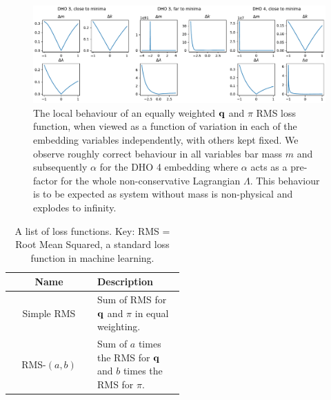 \begin{figure}[t]
  \includegraphics[width=\textwidth]{figures/loss-function-behaviour.pdf}
  \caption{The local behaviour of an equally weighted $\vb{q}$ and $\pi$ RMS loss function, when viewed as a function of variation in each of the embedding variables independently, with others kept fixed. We observe roughly correct behaviour in all variables bar mass $m$ and subsequently $\alpha$ for the DHO 4 embedding where $\alpha$ acts as a pre-factor for the whole non-conservative Lagrangian $\Lambda$. This behaviour is to be expected as system without mass is non-physical and explodes to infinity.}
  \label{fig:loss-function-behaviour}
\end{figure}

\begin{table}
\label{table:loss-fns}
\centering
\caption{A list of loss functions. Key: RMS = Root Mean Squared, a standard loss function in machine learning.%
}
\begin{tabular}{c|p{0.5\linewidth}}
  Name & Description \\
  \hline
  Simple RMS & Sum of RMS for $\vb{q}$ and $\pi$ in equal weighting. \\
  RMS-$(a, b)$ & Sum of $a$ times the RMS for $\vb{q}$ and $b$ times the RMS for $\pi$. \\
\end{tabular}
\end{table}


